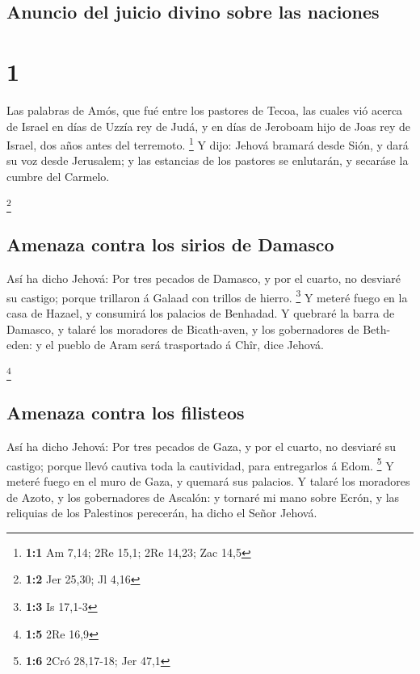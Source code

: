 \hypertarget{anuncio-del-juicio-divino-sobre-las-naciones}{%
\subsection{Anuncio del juicio divino sobre las
naciones}\label{anuncio-del-juicio-divino-sobre-las-naciones}}

\hypertarget{section}{%
\section{1}\label{section}}

 Las palabras de Amós, que fué entre los pastores de Tecoa,
las cuales vió acerca de Israel en días de Uzzía rey de Judá, y en días
de Jeroboam hijo de Joas rey de Israel, dos años antes del terremoto.
\footnote{\textbf{1:1} Am 7,14; 2Re 15,1; 2Re 14,23; Zac 14,5}
 Y dijo: Jehová bramará desde Sión, y dará su voz desde
Jerusalem; y las estancias de los pastores se enlutarán, y secaráse la
cumbre del Carmelo.

\footnote{\textbf{1:2} Jer 25,30; Jl 4,16}

\hypertarget{amenaza-contra-los-sirios-de-damasco}{%
\subsection{Amenaza contra los sirios de
Damasco}\label{amenaza-contra-los-sirios-de-damasco}}

 Así ha dicho Jehová: Por tres pecados de Damasco, y por el
cuarto, no desviaré su castigo; porque trillaron á Galaad con trillos de
hierro. \footnote{\textbf{1:3} Is 17,1-3}  Y meteré fuego en
la casa de Hazael, y consumirá los palacios de Benhadad.  Y
quebraré la barra de Damasco, y talaré los moradores de Bicath-aven, y
los gobernadores de Beth-eden: y el pueblo de Aram será trasportado á
Chîr, dice Jehová.

\footnote{\textbf{1:5} 2Re 16,9}

\hypertarget{amenaza-contra-los-filisteos}{%
\subsection{Amenaza contra los
filisteos}\label{amenaza-contra-los-filisteos}}

 Así ha dicho Jehová: Por tres pecados de Gaza, y por el
cuarto, no desviaré su castigo; porque llevó cautiva toda la cautividad,
para entregarlos á Edom. \footnote{\textbf{1:6} 2Cró 28,17-18; Jer 47,1}
 Y meteré fuego en el muro de Gaza, y quemará sus palacios.
 Y talaré los moradores de Azoto, y los gobernadores de
Ascalón: y tornaré mi mano sobre Ecrón, y las reliquias de los
Palestinos perecerán, ha dicho el Señor Jehová.

